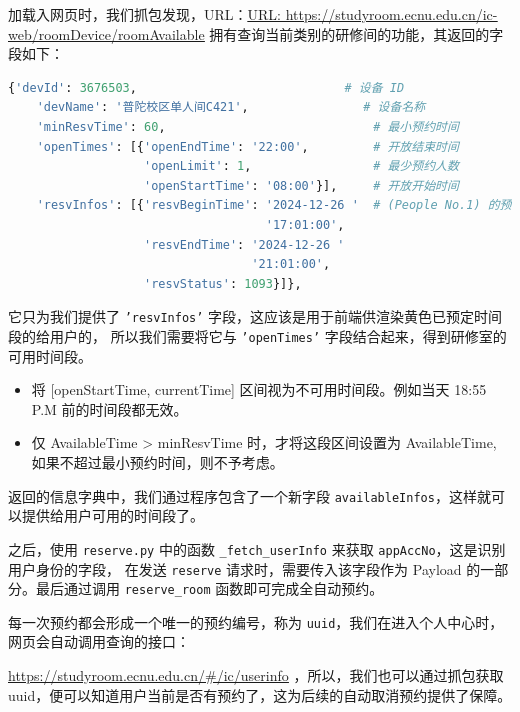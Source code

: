 \documentclass[14pt,a4paper,UTF8,twoside]{article}
\begin{document}
    加载入网页时，我们抓包发现，URL：\href{https://studyroom.ecnu.edu.cn/ic-web/roomDevice/roomAvailable}{\underline{URL: https://studyroom.ecnu.edu.cn/ic-web/roomDevice/roomAvailable}}
    拥有查询当前类别的研修间的功能，其返回的字段如下：

    \begin{lstlisting}[language=python]
    {'devId': 3676503,                             # 设备 ID
    'devName': '普陀校区单人间C421',                # 设备名称
    'minResvTime': 60,                             # 最小预约时间
    'openTimes': [{'openEndTime': '22:00',         # 开放结束时间
                   'openLimit': 1,                 # 最少预约人数
                   'openStartTime': '08:00'}],     # 开放开始时间
    'resvInfos': [{'resvBeginTime': '2024-12-26 '  # (People No.1) 的预约信息
                                    '17:01:00',
                   'resvEndTime': '2024-12-26 '
                                  '21:01:00',
                   'resvStatus': 1093}]},
    \end{lstlisting}

    它只为我们提供了 \texttt{'resvInfos'} 字段，这应该是用于前端供渲染黄色已预定时间段的给用户的，
    所以我们需要将它与 \texttt{'openTimes'} 字段结合起来，得到研修室的可用时间段。

    \begin{note}
        \begin{itemize}
            \item 将 [openStartTime, currentTime] 区间视为不可用时间段。例如当天 18:55 P.M 前的时间段都无效。
            \item 仅 AvailableTime > minResvTime 时，才将这段区间设置为 AvailableTime, 如果不超过最小预约时间，则不予考虑。
        \end{itemize}
    \end{note}

    返回的信息字典中，我们通过程序包含了一个新字段 \texttt{availableInfos}，这样就可以提供给用户可用的时间段了。

    之后，使用 \texttt{reserve.py} 中的函数 \texttt{\_fetch\_userInfo} 来获取 \texttt{appAccNo}，这是识别用户身份的字段，
    在发送 \texttt{reserve} 请求时，需要传入该字段作为 Payload 的一部分。最后通过调用 \texttt{reserve\_room} 函数即可完成全自动预约。

    \begin{note}
        每一次预约都会形成一个唯一的预约编号，称为 \texttt{uuid}，我们在进入个人中心时，网页会自动调用查询的接口：

        \href{https://studyroom.ecnu.edu.cn/#/ic/userinfo}{\underline{https://studyroom.ecnu.edu.cn/\#/ic/userinfo}}
        ，所以，我们也可以通过抓包获取 uuid，便可以知道用户当前是否有预约了，这为后续的自动取消预约提供了保障。
    \end{note}
\end{document}
